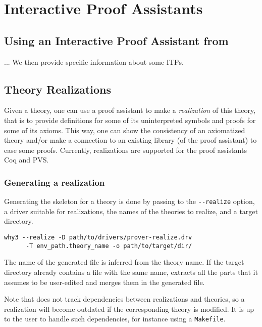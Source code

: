 
\chapter{Interactive Proof Assistants}

\section{Using an Interactive Proof Assistant from \why}


... We then provide specific information about some ITPs.

\section{Theory Realizations}
\label{sec:realizations}

Given a \why theory, one can use a proof assistant to make a
\emph{realization} of this theory, that is to provide definitions for
some of its uninterpreted symbols and proofs for some of its
axioms. This way, one can show the consistency of an axiomatized
theory and/or make a connection to an existing library (of the proof
assistant) to ease some proofs.
Currently, realizations are supported for the proof assistants Coq and PVS.

\subsection{Generating a realization}

Generating the skeleton for a theory is done by passing to \why the
\verb+--realize+ option, a driver suitable for realizations, the names of
the theories to realize, and a target directory.

\begin{verbatim}
why3 --realize -D path/to/drivers/prover-realize.drv
      -T env_path.theory_name -o path/to/target/dir/
\end{verbatim}

The name of the generated file is inferred from the theory name. If the
target directory already contains a file with the same name, \why
extracts all the parts that it assumes to be user-edited and merges them in
the generated file.

Note that \why does not track dependencies between realizations and
theories, so a realization will become outdated if the corresponding
theory is modified.
It is up to the user to handle such dependencies, for instance using a
\texttt{Makefile}.

